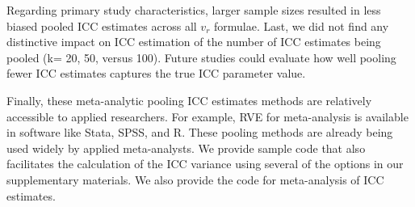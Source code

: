 Regarding primary study characteristics, larger sample sizes resulted in less biased pooled ICC estimates across all $v_r$ formulae. Last, we did not find any distinctive impact on ICC estimation of the number of ICC estimates being pooled (k= 20, 50, versus 100). Future studies could evaluate how well pooling fewer ICC estimates captures the true ICC parameter value.  

Finally, these meta-analytic pooling ICC estimates methods are relatively accessible to applied researchers. For example, RVE for meta-analysis is available in software like Stata, SPSS, and R. These pooling methods are already being used widely by applied meta-analysts. We provide sample code that also facilitates the calculation of the ICC variance using several of the options in our supplementary materials. We also provide the code for meta-analysis of ICC estimates.
